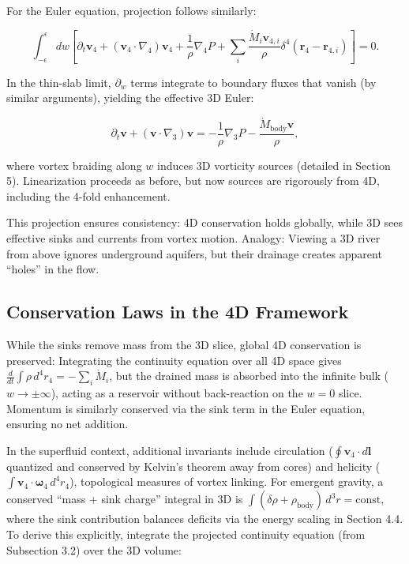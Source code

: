 \documentclass{article}
\begin{document}
For the Euler equation, projection follows similarly:

\[
\int_{-\epsilon}^{\epsilon} dw \left[ \partial_t \mathbf{v}_4 + (\mathbf{v}_4 \cdot \nabla_4) \mathbf{v}_4 + \frac{1}{\rho} \nabla_4 P + \sum_i \frac{\dot{M}_i \mathbf{v}_{4,i}}{\rho} \delta^4(\mathbf{r}_4 - \mathbf{r}_{4,i}) \right] = 0.
\]

In the thin-slab limit, $\partial_w$ terms integrate to boundary fluxes that vanish (by similar arguments), yielding the effective 3D Euler:

\[
\partial_t \mathbf{v} + (\mathbf{v} \cdot \nabla_3) \mathbf{v} = -\frac{1}{\rho} \nabla_3 P - \frac{\dot{M}_{\text{body}} \mathbf{v}}{\rho},
\]

where vortex braiding along $w$ induces 3D vorticity sources (detailed in Section 5). Linearization proceeds as before, but now sources are rigorously from 4D, including the 4-fold enhancement.

This projection ensures consistency: 4D conservation holds globally, while 3D sees effective sinks and currents from vortex motion. Analogy: Viewing a 3D river from above ignores underground aquifers, but their drainage creates apparent ``holes'' in the flow.

\subsection{Conservation Laws in the 4D Framework}

While the sinks remove mass from the 3D slice, global 4D conservation is preserved: Integrating the continuity equation over all 4D space gives $\frac{d}{dt} \int \rho \, d^4 r_4 = -\sum_i \dot{M}_i$, but the drained mass is absorbed into the infinite bulk ($w \to \pm \infty$), acting as a reservoir without back-reaction on the $w=0$ slice. Momentum is similarly conserved via the sink term in the Euler equation, ensuring no net addition.

In the superfluid context, additional invariants include circulation ($\oint \mathbf{v}_4 \cdot d\mathbf{l}$ quantized and conserved by Kelvin's theorem away from cores) and helicity ($\int \mathbf{v}_4 \cdot \boldsymbol{\omega}_4 \, d^4 r_4$), topological measures of vortex linking. For emergent gravity, a conserved ``mass + sink charge'' integral in 3D is $\int (\delta\rho + \rho_{\text{body}}) \, d^3 r = \text{const}$, where the sink contribution balances deficits via the energy scaling in Section 4.4. To derive this explicitly, integrate the projected continuity equation (from Subsection 3.2) over the 3D volume:
\end{document}
